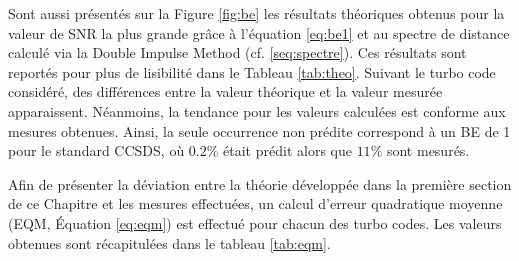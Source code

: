 Sont aussi présentés sur la Figure \ref{fig:be} les résultats théoriques obtenus pour la valeur de SNR la plus grande
grâce à l'équation \ref{eq:be1} et au spectre de distance calculé via la Double Impulse Method (cf. \ref{seq:spectre}).
Ces résultats sont reportés pour plus de lisibilité dans le Tableau \ref{tab:theo}. Suivant le turbo code considéré,
des différences entre la valeur théorique et la valeur mesurée apparaissent. Néanmoins, la tendance pour les valeurs
calculées est conforme
aux mesures obtenues. Ainsi, la seule occurrence non prédite correspond à un BE de 1 pour le standard CCSDS, où $0.2\%$ 
était prédit alors que $11\%$ sont mesurés.

\begin{table}[]
\centering
\caption{Distribution théorique des erreurs dans le plancher d'erreur selon l'équation \ref{eq:be1} pour différents turbo 
codes standardisés}
\label{tab:theo}
\end{table}

Afin de présenter la déviation entre la théorie développée dans la première section de ce Chapitre et les mesures 
effectuées, un calcul d'erreur quadratique moyenne (EQM, Équation \ref{eq:eqm}) est effectué pour chacun des turbo codes. 
Les valeurs obtenues sont récapitulées dans le tableau \ref{tab:eqm}.


